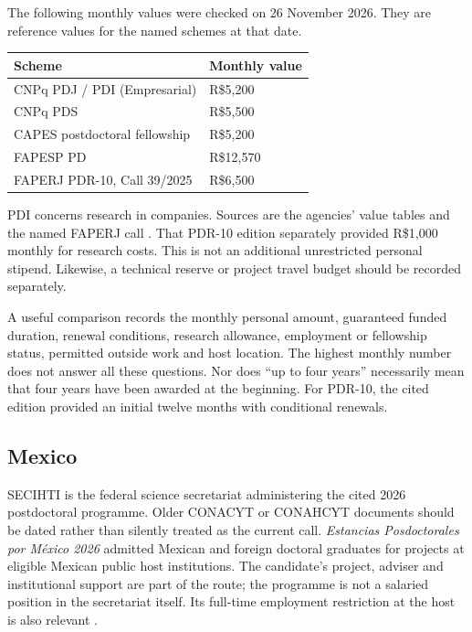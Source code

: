The following monthly values were checked on
26 November 2026. They are reference values for the named
schemes at that date.

\begin{center}
\begin{tabular}{p{}
p{}}
\textbf{Scheme} & \textbf{Monthly value} \\
\hline
CNPq PDJ / PDI (Empresarial) & R\$5,200 \\
CNPq PDS & R\$5,500 \\
CAPES postdoctoral fellowship & R\$5,200 \\
FAPESP PD & R\$12,570 \\
FAPERJ PDR-10, Call 39/2025 & R\$6,500 \\
\end{tabular}
\end{center}

PDI concerns research in companies.
Sources are the agencies' value tables and
the named
FAPERJ call
\cite{gsf-cnpq-rates,gsf-capes-rates,
gsf-fapesp-rates,gsf-faperj-pdr10}.
That PDR-10 edition separately provided
R\$1,000 monthly
for research costs. This is not an additional
unrestricted
personal stipend. Likewise, a technical
reserve or
project travel budget should be recorded
separately.

A useful comparison records the monthly
personal amount,
guaranteed funded duration, renewal
conditions,
research allowance, employment or fellowship
status,
permitted outside work and host location.
The highest monthly number does not answer
all these
questions. Nor does ``up to four years''
necessarily mean
that four years have been awarded at the
beginning.
For PDR-10, the cited edition provided an
initial
twelve months with conditional renewals.

\subsection{Mexico}
\label{subsection-gsf-funding-mexico}

SECIHTI is the federal science secretariat
administering the cited 2026 postdoctoral
programme. Older CONACYT or CONAHCYT
documents should be dated rather than
silently treated
as the current call.
\emph{Estancias Posdoctorales por México
2026}
admitted Mexican and foreign doctoral
graduates for
projects at eligible Mexican public host
institutions.
The candidate's project, adviser and
institutional
support are part of the route; the programme
is not
a salaried position in the secretariat
itself.
Its full-time employment restriction at the
host is
also relevant \cite{gsf-secihti-2026}.

